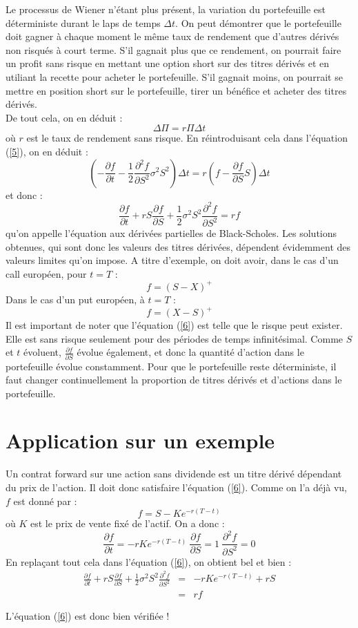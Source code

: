 Le processus de Wiener n'étant plus présent, la variation du portefeuille est déterministe durant le laps de temps $\Delta t$. On peut démontrer que le portefeuille doit gagner à chaque moment le même taux de rendement que d'autres dérivés non risqués à court terme. S'il gagnait plus que ce rendement, on pourrait faire un profit sans risque en mettant une option short sur des titres dérivés et en utiliant la recette pour acheter le portefeuille. S'il gagnait moins, on pourrait se mettre en position short sur le portefeuille, tirer un bénéfice et acheter des titres dérivés.\\
De tout cela, on en déduit : \[\Delta\Pi = r\Pi\Delta t\]
où $r$ est le taux de rendement sans risque. En réintroduisant cela dans l'équation (\ref{5}), on en déduit : 
\[\left( -\frac{\partial f}{\partial t} - \frac{1}{2} \frac{\partial^2 f}{\partial S^2}\sigma^2S^2 \right) \Delta t = r\left( f-\frac{\partial f}{\partial S}S\right) \Delta t\]
et donc :
\begin{equation} \label{6} \frac{\partial f}{\partial t}+rS\frac{\partial f}{\partial S} + \frac{1}{2} \sigma^2S^2 \frac{\partial^2 f}{\partial S^2} = rf\end{equation}
qu'on appelle l'équation aux dérivées partielles de Black-Scholes. Les solutions obtenues, qui sont donc les valeurs des titres dérivées, dépendent évidemment des valeurs limites qu'on impose. A titre d'exemple, on doit avoir, dans le cas d'un call européen, pour $t=T$ : \[f=(S-X)^+\]
Dans le cas d'un put européen, à $t=T$ : \[f=(X-S)^+\]
Il est important de noter que l'équation (\ref{6}) est telle que le risque peut exister. Elle est sans risque seulement pour des périodes de temps infinitésimal. Comme $S$ et $t$ évoluent, $\frac{\partial f}{\partial S}$ évolue également, et donc la quantité d'action dans le portefeuille évolue constamment. Pour que le portefeuille reste déterministe, il faut changer continuellement la proportion de titres dérivés et d'actions dans le portefeuille.

\section{Application sur un exemple}
Un contrat forward sur une action sans dividende est un titre dérivé dépendant du prix de l'action. Il doit donc satisfaire l'équation (\ref{6}). Comme on l'a déjà vu, $f$ est donné par : 
\[f=S-Ke^{-r(T-t)}\]
où $K$ est le prix de vente fixé de l'actif. On a donc : 
\[\frac{\partial f}{\partial t} = -rKe^{-r(T-t)}\ \frac{\partial f}{\partial S}=1\ \frac{\partial^2 f}{\partial S^2} = 0\]
En replaçant tout cela dans l'équation (\ref{6}), on obtient bel et bien :
\begin{eqnarray*}
	\frac{\partial f}{\partial t}+rS\frac{\partial f}{\partial S} + \frac{1}{2} \sigma^2S^2 \frac{\partial^2 f}{\partial S^2}
		&=& -rKe^{-r(T-t)}+rS\\
		&=& rf
\end{eqnarray*}

L'équation (\ref{6}) est donc bien vérifiée !
